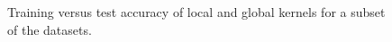\documentclass{article}
\theoremstyle{definition}
\begin{document}
\begin{table}
	\begin{center}
		\begin{subfigure}[c,top]{0.48\textwidth}	\centering
			\label{t2n}	
\caption{\label{t3_short} Training versus test accuracy of local and global kernels for a subset of the datasets.
}
\end{subfigure}
\end{center}
\end{table}
\end{document}

